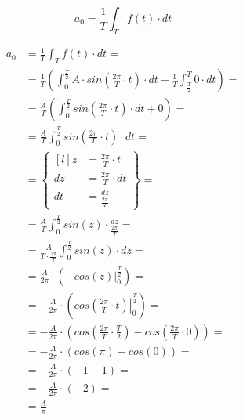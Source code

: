 \begin{task}
\begin{equation}
a_0=\frac{1}{T}\int_{T}f(t) \cdot dt
\end{equation}


\begin{align*}
a_0&=\frac{1}{T}\int_{T}f(t) \cdot dt=\\
&=\frac{1}{T}\left(\int_{0}^{\frac{T}{2}}A \cdot sin\left( \frac{2\pi}{T} \cdot t\right) \cdot dt 
+ \frac{1}{T}\int_{\frac{T}{2}}^{T}0 \cdot dt \right)=\\
&=\frac{A}{T}\left(\int_{0}^{\frac{T}{2}}sin\left( \frac{2\pi}{T} \cdot t\right) \cdot dt 
+ 0 \right)=\\
&=\frac{A}{T}\int_{0}^{\frac{T}{2}}sin\left( \frac{2\pi}{T} \cdot t\right) \cdot dt=\\
&=\begin{Bmatrix*}[l]
z&=\frac{2\pi}{T} \cdot t\\
dz&=\frac{2\pi}{T} \cdot dt\\
dt&=\frac{dz}{\frac{2\pi}{T}}
\end{Bmatrix*}=\\
&=\frac{A}{T}\int_{0}^{\frac{T}{2}}sin\left( z\right) \cdot \frac{dz}{\frac{2\pi}{T}}=\\
&=\frac{A}{T\cdot \frac{2\pi}{T}}\int_{0}^{\frac{T}{2}}sin\left( z\right) \cdot dz=\\
&=\frac{A}{2\pi}\cdot \left(\left . -cos\left( z\right) \right|_{0}^{\frac{T}{2}}\right)=\\
&=-\frac{A}{2\pi}\cdot \left(\left . cos\left( \frac{2\pi}{T} \cdot t\right) \right|_{0}^{\frac{T}{2}}\right)=\\
&=-\frac{A}{2\pi}\cdot \left( cos\left( \frac{2\pi}{T} \cdot \frac{T}{2}\right) - cos\left( \frac{2\pi}{T} \cdot 0\right)\right)=\\
&=-\frac{A}{2\pi}\cdot \left( cos\left( \pi\right) - cos\left( 0\right)\right)=\\
&=-\frac{A}{2\pi}\cdot \left( -1 - 1\right)=\\
&=-\frac{A}{2\pi}\cdot \left( -2\right)=\\
&=\frac{A}{\pi}
\end{align*}




\end{task}
